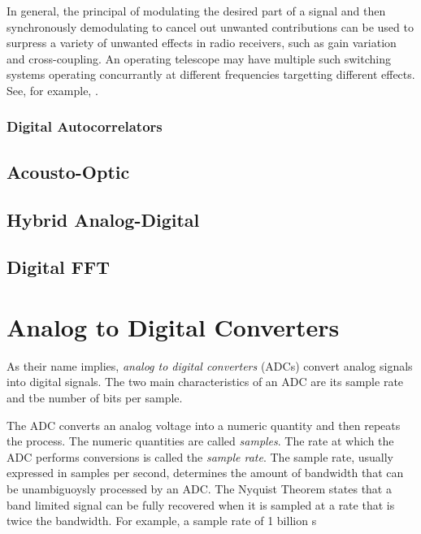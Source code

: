 \documentclass{article}
\begin{document}
In general, the principal of modulating the desired part of a signal and then synchronously demodulating to cancel out unwanted contributions can be used to surpress a variety of unwanted effects in radio receivers, such as gain variation and cross-coupling. An operating telescope may have multiple such switching systems operating concurrantly at different frequencies targetting different effects. See, for example, \cite{Erickson2007}. 
 



\subsubsection{Digital Autocorrelators}\label{digital-autocorrelators}

\subsection{Acousto-Optic}\label{acousto-optic}

\subsection{Hybrid Analog-Digital}\label{hybrid-analog-digital}

\subsection{Digital FFT}\label{digital-fft}

\section{Analog to Digital
Converters}\label{analog-to-digital-converters}

As their name implies, \emph{analog to digital converters} (ADCs)
convert analog signals into digital signals. The two main
characteristics of an ADC are its sample rate and tbe number of bits per
sample.

The ADC converts an analog voltage into a numeric quantity and then
repeats the process. The numeric quantities are called \emph{samples}.
The rate at which the ADC performs conversions is called the
\emph{sample rate}. The sample rate, usually expressed in samples per
second, determines the amount of bandwidth that can be unambiguoysly
processed by an ADC. The Nyquist Theorem states that a band limited
signal can be fully recovered when it is sampled at a rate that is twice
the bandwidth. For example, a sample rate of 1 billion s
\end{document}
